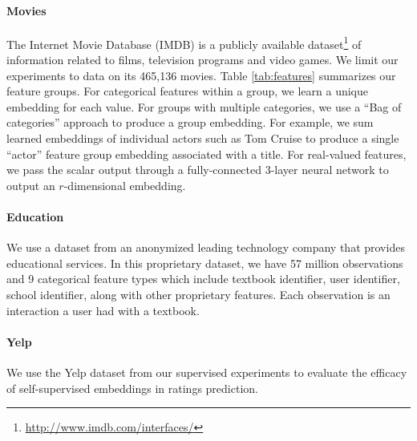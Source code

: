 \documentclass{article}
\begin{document}
%

\paragraph{Movies}
The Internet Movie Database (IMDB) is a publicly available dataset\footnote{\href{http://www.imdb.com/interfaces/}{http://www.imdb.com/interfaces/}} of information related to films, television programs and video games.
We limit our experiments to data on its 465,136 movies.
Table \ref{tab:features} summarizes our feature groups. For categorical features within a group, we learn a unique embedding for each value.
For groups with multiple categories, we use a ``Bag of categories'' approach to produce a group embedding.
For example, we sum learned embeddings of individual actors such as Tom Cruise to produce a single ``actor'' feature group embedding associated with a title. For real-valued features, we pass the scalar output through a fully-connected 3-layer neural network to output an $r$-dimensional embedding.


\paragraph{Education}
We use a dataset from an anonymized leading technology company that provides educational services.
In this proprietary dataset, we have 57  million observations and 9 categorical feature types which include textbook identifier, user identifier, school identifier,
along with other proprietary features.
Each observation is an interaction a user had with a textbook.

\paragraph{Yelp}
We use the Yelp dataset from our supervised experiments to evaluate the efficacy of self-supervised embeddings in ratings prediction.
\end{document}
